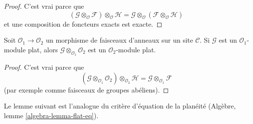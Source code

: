\begin{proof}

C'est vrai parce que
$$
(\mathcal{G} \otimes_\mathcal{O} \mathcal{F}) \otimes_\mathcal{O} \mathcal{H}
=
\mathcal{G} \otimes_\mathcal{O} (\mathcal{F} \otimes_\mathcal{O} \mathcal{H})
$$
et une composition de foncteurs exacts est exacte.

\end{proof}

\begin{lemma}

\label{lemma-flat-change-of-rings}
Soit $\mathcal{O}_1 \to \mathcal{O}_2$ un morphisme de faisceaux d'anneaux
sur un site $\mathcal{C}$. Si $\mathcal{G}$ est un
$\mathcal{O}_1$-module plat, alors
$\mathcal{G} \otimes_{\mathcal{O}_1} \mathcal{O}_2$ est un
$\mathcal{O}_2$-module plat.
\end{lemma}

\begin{proof}

C'est vrai parce que
$$
(\mathcal{G} \otimes_{\mathcal{O}_1} \mathcal{O}_2)
\otimes_{\mathcal{O}_2} \mathcal{H}
=
\mathcal{G} \otimes_{\mathcal{O}_1} \mathcal{F}
$$
(par exemple comme faisceaux de groupes abéliens).

\end{proof}

\noindent
Le lemme suivant est l'analogue du critère d'équation de la planéité (Algèbre, lemme \ref{algebra-lemma-flat-eq}).

